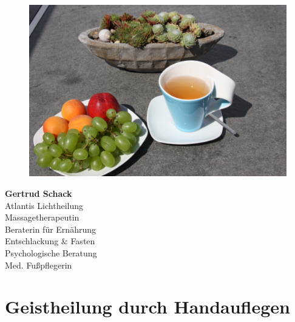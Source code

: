 \documentclass[10pt,foldmark,notumble]{leaflet}
\begin{document}
\begin{figure}[h] %
\begin{center}
\includegraphics [scale=.055]{Bild_Fasten.JPG}
\end{center}
\end{figure}

\begin{center}
{\LARGE \bf {Gertrud Schack}}\\
\vspace*{5mm}
\large {Atlantis Lichtheilung} \\ %
\vspace*{1mm}
\large {Massagetherapeutin} \\ 
\vspace*{1mm}
\large {Beraterin für Ernährung } \\ %
\vspace*{1mm}
\large {Entschlackung \& Fasten} \\ 
\vspace*{1mm}
\large {Psychologische Beratung} \\ 
\vspace*{1mm}
\large {Med. Fußpflegerin} \\ 

\end{center}


\newpage
\section{Geistheilung durch Handauflegen}
\end{document}

